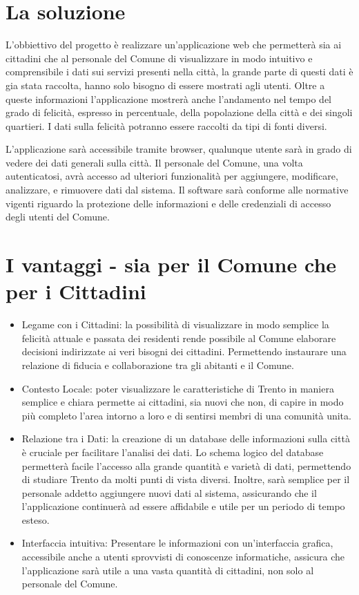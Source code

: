 \section{La soluzione}
    L'obbiettivo del progetto è realizzare un'applicazione web che permetterà sia ai cittadini che al personale del Comune di visualizzare in modo intuitivo e comprensibile i dati sui servizi presenti nella città, la grande parte di questi dati è gia stata raccolta, hanno solo bisogno di essere mostrati agli utenti. Oltre a queste informazioni l'applicazione mostrerà anche l'andamento nel tempo del grado di felicità, espresso in percentuale, della popolazione della città e dei singoli quartieri. I dati sulla felicità potranno essere raccolti da tipi di fonti diversi.

    L'applicazione sarà accessibile tramite browser, qualunque utente sarà in grado di vedere dei dati generali sulla città. Il personale del Comune, una volta autenticatosi, avrà accesso ad ulteriori funzionalità per aggiungere, modificare, analizzare, e rimuovere dati dal sistema. Il software sarà conforme alle normative vigenti riguardo la protezione delle informazioni e delle credenziali di accesso degli utenti del Comune.


\section{I vantaggi - sia per il Comune che per i Cittadini}
    \begin{itemize}
        \item Legame con i Cittadini: la possibilità di visualizzare in modo semplice la felicità attuale e passata dei residenti rende possibile al Comune elaborare decisioni indirizzate ai veri bisogni dei cittadini. Permettendo instaurare una relazione di fiducia e collaborazione tra gli abitanti e il Comune.
        \item Contesto Locale: poter visualizzare le caratteristiche di Trento in maniera semplice e chiara permette ai cittadini, sia nuovi che non, di capire in modo più completo l'area intorno a loro e di sentirsi membri di una comunità unita.
        \item Relazione tra i Dati: la creazione di un database delle informazioni sulla città è cruciale per facilitare l'analisi dei dati. Lo schema logico del database permetterà facile l'accesso alla grande quantità e varietà di dati, permettendo di studiare Trento da molti punti di vista diversi. Inoltre, sarà semplice per il personale addetto aggiungere nuovi dati al sistema, assicurando che il l'applicazione continuerà ad essere affidabile e utile per un periodo di tempo esteso.
        \item Interfaccia intuitiva: Presentare le informazioni con un'interfaccia grafica, accessibile anche a utenti sprovvisti di conoscenze informatiche, assicura che l'applicazione sarà utile a una vasta quantità di cittadini, non solo al personale del Comune.
    \end{itemize}